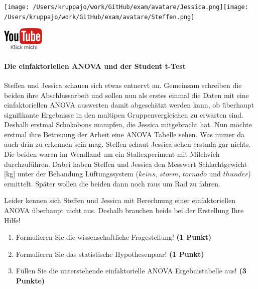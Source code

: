 \documentclass[a4paper, 9pt]{scrartcl}\usepackage[]{graphicx}\usepackage[]{xcolor}
\begin{document}
 
\begin{minipage}[t]{0.5\textwidth}
\texttt{[image: /Users/kruppajo/work/GitHub/exam/avatare/Jessica.png]}\hspace{-4mm}\texttt{[image: /Users/kruppajo/work/GitHub/exam/avatare/Steffen.png]}
\end{minipage}
\begin{minipage}[t]{0.5\textwidth}
\hfill
\href{https://youtu.be/49hvImMwVyE}{\includegraphics[width = 2cm]{img/youtube}}
\end{minipage}



\paragraph{Die einfaktoriellen ANOVA und der Student t-Test}

Steffen und Jessica schauen sich etwas entnervt an. Gemeinsam schreiben die beiden ihre Abschlussarbeit und sollen nun als erstes einmal die Daten mit eine einfaktoriellen ANOVA auswerten damit abgeschätzt werden kann, ob überhaupt signifikante Ergebnisse in den multipen Gruppenvergleichen zu erwarten sind. Deshalb erstmal Schokobons mampfen, die Jessica mitgebracht hat. Nun möchte erstmal ihre Betreuung der Arbeit eine ANOVA Tabelle sehen. Was immer da auch drin zu erkennen sein mag. Steffen schaut Jessica sehen erstmla gar nichts. Die beiden waren im Wendland um ein Stallexperiment mit Milchvieh durchzuführen. Dabei haben Steffen und Jessica den Messwert Schlachtgewicht [kg] unter der Behandung Lüftungssystem ($keins$, $storm$, $tornado$ und $thunder$) ermittelt. Später wollen die beiden dann noch raus um Rad zu fahren.



\vspace{1ex}

Leider kennen sich Steffen und Jessica mit Berechnung einer einfaktoriellen ANOVA überhaupt nicht aus. Deshalb brauchen beide bei der Erstellung Ihre Hilfe! 

\begin{enumerate}
  \item Formulieren Sie die wissenschaftliche Fragestellung! \textbf{(1 Punkt)}
  \item Formulieren Sie das statistische Hypothesenpaar! \textbf{(1 Punkt)}
\item Füllen Sie die unterstehende einfaktorielle ANOVA Ergebnistabelle aus! \textbf{(3 Punkte)}
\end{enumerate}
\end{document}
